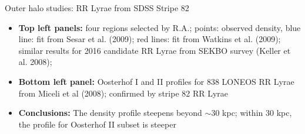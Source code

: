 \documentclass[letterpaper,landscape]{slides}
\begin{document}
\begin{slide}
{\begin{minipage}[t]{13cm}
\begin{center}
\vskip -1in
{\large \color{red} Outer halo studies: RR Lyrae from SDSS Stripe 82}
\end{center}

\begin{itemize}
\item {\bf Top left panels:} four regions selected by R.A.; points: observed 
     density, blue line: fit from Sesar et al. (2009); red lines: fit from 
       Watkins et al. (2009); similar results for 2016 candidate
           RR Lyrae from SEKBO survey (Keller et al. 2008); 
\item {\bf Bottom left panel:} Oosterhof I and II profiles for 838 LONEOS
           RR Lyrae from Miceli et al (2008); confirmed by stripe 82 RR Lyrae 
\item {\color{blue} {\bf Conclusions:} The density profile steepens beyond $\sim$30
     kpc; within 30 kpc, the profile for Oosterhof II subset is steeper}
\end{itemize}     

\end{minipage}}
\vfill 
\end{slide}
\end{document}
